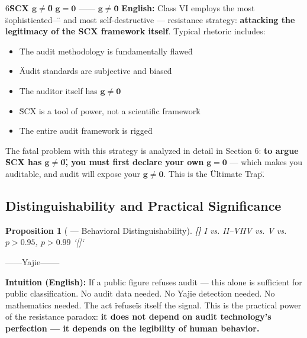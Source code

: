 \documentclass[12pt,a4paper]{article}
\newtheorem{proposition}[theorem]{Proposition}
\theoremstyle{remark}
\newcommand{\g}{\mathbf{g}}
\newcommand{\rigorPartial}{\textnormal{\textbf{[]}}}
\begin{document}
\vspace{4pt}
6\textbf{\"SCX $ \g \neq \mathbf{0} $\"} $ \g = \mathbf{0} $ —— $ \g \neq \mathbf{0} $\"\"

\vspace{6pt}
\noindent
\textbf{English:} Class VI employs the most \"sophisticated\" — and most self-destructive — resistance strategy: \textbf{attacking the legitimacy of the SCX framework itself}. Typical rhetoric includes:

\begin{itemize}
    \item \"The audit methodology is fundamentally flawed\"
    \item \"Audit standards are subjective and biased\"
    \item \"The auditor itself has $ \g \neq \mathbf{0} $\"
    \item \"SCX is a tool of power, not a scientific framework\"
    \item \"The entire audit framework is rigged\"
\end{itemize}

\vspace{4pt}
The fatal problem with this strategy is analyzed in detail in Section 6: \textbf{to argue \"SCX has $ \g \neq \mathbf{0} $\", you must first declare your own} $ \g = \mathbf{0} $ — which makes you auditable, and audit will expose your $ \g \neq \mathbf{0} $. This is the \"Ultimate Trap.\"

\subsection{}
\subsection{Distinguishability and Practical Significance}

\begin{proposition}[ — Behavioral Distinguishability]\label{prop:distinguish}\rigorPartial
I vs. II--VIIV vs. V vs.  $ p > 0.95 $, $ p > 0.99 $ `[]`
\end{proposition}

\vspace{4pt}
\noindent
\textbf{} ——Yajie\"\"\textbf{——}

\vspace{4pt}
\noindent
\textbf{Intuition (English):} If a public figure refuses audit — this alone is sufficient for public classification. No audit data needed. No Yajie detection needed. No mathematics needed. The act \"refuse\" is itself the signal. This is the practical power of the resistance paradox: \textbf{it does not depend on audit technology's perfection — it depends on the legibility of human behavior.}
\end{document}

